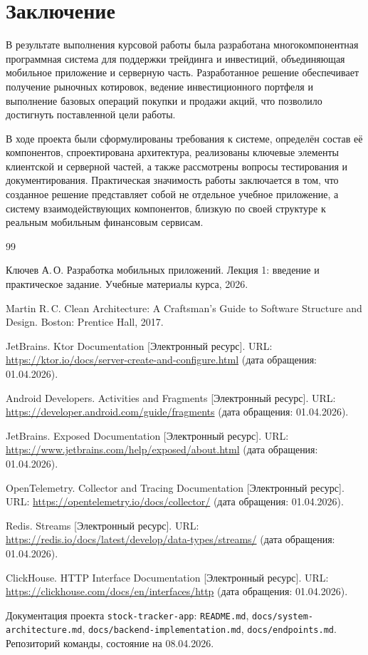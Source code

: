\documentclass[12pt,a4paper]{article}
\begin{document}
\section*{Заключение}

В результате выполнения курсовой работы была разработана многокомпонентная программная система для поддержки трейдинга и инвестиций, объединяющая мобильное приложение и серверную часть. Разработанное решение обеспечивает получение рыночных котировок, ведение инвестиционного портфеля и выполнение базовых операций покупки и продажи акций, что позволило достигнуть поставленной цели работы.

В ходе проекта были сформулированы требования к системе, определён состав её компонентов, спроектирована архитектура, реализованы ключевые элементы клиентской и серверной частей, а также рассмотрены вопросы тестирования и документирования. Практическая значимость работы заключается в том, что созданное решение представляет собой не отдельное учебное приложение, а систему взаимодействующих компонентов, близкую по своей структуре к реальным мобильным финансовым сервисам.

\begin{thebibliography}{99}

Ключев А.\,О. Разработка мобильных приложений. Лекция 1: введение и практическое задание. Учебные материалы курса, 2026.

Martin R.\,C. Clean Architecture: A Craftsman's Guide to Software Structure and Design. Boston: Prentice Hall, 2017.

JetBrains. Ktor Documentation [Электронный ресурс]. URL: \url{https://ktor.io/docs/server-create-and-configure.html} (дата обращения: 01.04.2026).

Android Developers. Activities and Fragments [Электронный ресурс]. URL: \url{https://developer.android.com/guide/fragments} (дата обращения: 01.04.2026).

JetBrains. Exposed Documentation [Электронный ресурс]. URL: \url{https://www.jetbrains.com/help/exposed/about.html} (дата обращения: 01.04.2026).

OpenTelemetry. Collector and Tracing Documentation [Электронный ресурс]. URL: \url{https://opentelemetry.io/docs/collector/} (дата обращения: 01.04.2026).

Redis. Streams [Электронный ресурс]. URL: \url{https://redis.io/docs/latest/develop/data-types/streams/} (дата обращения: 01.04.2026).

ClickHouse. HTTP Interface Documentation [Электронный ресурс]. URL: \url{https://clickhouse.com/docs/en/interfaces/http} (дата обращения: 01.04.2026).

Документация проекта \texttt{stock-tracker-app}: \texttt{README.md}, \texttt{docs/system-architecture.md}, \texttt{docs/backend-implementation.md}, \texttt{docs/endpoints.md}. Репозиторий команды, состояние на 08.04.2026.

\end{thebibliography}
\end{document}
